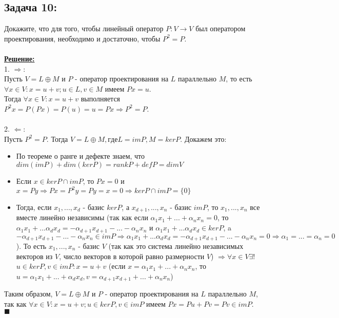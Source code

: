 \documentclass[a4paper,12pt,titlepage,final]{article}
\begin{document}
\subsection*{Задача 10:}
\noindent Докажите, что для того, чтобы линейный оператор $P: V \rightarrow V$ был оператором проектирования,
необходимо и достаточно, чтобы $P^2 = P$. \\ \\
\textbf{\underline{Решение:}} \\
1. $\Rightarrow:$ \\
Пусть $V = L \oplus M$ и $P$ - оператор проектирования на $L$ параллельно $M$, то есть
$\forall x \in V: x = u + v; u \in L, v \in M$ имеем $Px = u$. \\
Тогда $\forall x \in V: x = u + v$ выполняется $P^2x = P(Px) = P(u) = u = Px \Rightarrow P^2 = P$. \\ \\
2. $\Leftarrow:$ \\
Пусть $P^2 = P$. Тогда $V = L \oplus M, где L = imP, M = kerP$. Докажем это: \\
\begin {itemize}
\item По теореме о ранге и дефекте знаем, что $dim(imP) + dim(kerP) = rankP + defP = dim V$ \\
\item Если $x \in kerP \cap imP$, то $Px = 0$ и $x = Py \Rightarrow Px = P^2y = Py = x = 0 \Rightarrow kerP \cap imP = \{0\}$\\
\item Тогда, если $x_1, ... , x_d$ - базис $kerP$, а $x_{d+1}, ... , x_n$ - базис $imP$, то
$x_1, ... , x_n$ все вместе линейно независимы (так как если $\alpha_1 x_1 + ... + \alpha_n x_n = 0$, то
$\alpha_1 x_1 + ... \alpha_d x_d = -\alpha_{d+1} x_{d+1} - ... - \alpha_n x_n$ и
$\alpha_1 x_1 + ... \alpha_d x_d \in kerP$, a $-\alpha_{d+1} x_{d+1} - ... - \alpha_n x_n \in imP
\Rightarrow \alpha_1 x_1 + ... \alpha_d x_d = -\alpha_{d+1} x_{d+1} - ... - \alpha_n x_n = 0
\Rightarrow \alpha_1 = ... = \alpha_n  = 0$). То есть $x_1, ... , x_n$ - базис $V$ (так как
это система линейно независимых векторов из $V$, число векторов в которой равно размерности $V$) $\Rightarrow
\forall x \in V \exists !$ $u \in kerP, v \in im P: x = u + v$ (если $x = \alpha_1 x_1 + ... + \alpha_n x_n$, то
$u = \alpha_1 x_1 + ... + \alpha_d x_d, v = \alpha_{d+1} x_{d+1} + ... + \alpha_n x_n$)\\
\end {itemize}
Таким образом, $V = L \oplus M$ и $P$ - оператор проектирования на $L$ параллельно $M$, так как
$\forall x \in V: x = u + v; u \in kerP, v \in im P$ имеем $Px = Pu + Pv = Pv \in imP$. \\ $\blacksquare$ \\ \\ \\
\end{document}
